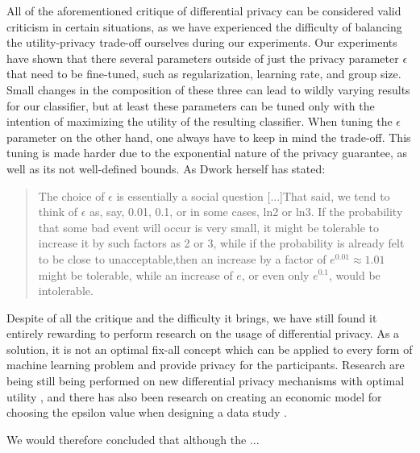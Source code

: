 All of the aforementioned critique of differential privacy can be considered valid criticism in certain situations, as we have experienced the difficulty of balancing the utility-privacy trade-off ourselves during our experiments. Our experiments have shown that there several parameters outside of just the privacy parameter $\epsilon$ that need to be fine-tuned, such as regularization, learning rate, and group size. Small changes in the composition of these three can lead to wildly varying results for our classifier, but at least these parameters can be tuned only with the intention of maximizing the utility of the resulting classifier. When tuning the $\epsilon$ parameter on the other hand, one always have to keep in mind the trade-off. This tuning is made harder due to the exponential nature of the privacy guarantee, as well as its not well-defined bounds. As Dwork herself has stated\citep{dwork2008differential}: 
\begin{quote}
	The choice of $\epsilon$ is essentially a social question [...]That said, we tend to think of $\epsilon$ as, say, 0.01, 0.1, or in some cases, ln2 or ln3. If the probability that some bad event will occur is very small, it 	might be tolerable to increase it by such factors as 2 or 3, while if the probability is already felt to be close to unacceptable,then an increase by a factor of $e^{0.01} ≈ 1.01$ might be tolerable, 	while an increase of $e$, or even only $e^{0.1}$, would be intolerable.
\end{quote}

Despite of all the critique and the difficulty it brings, we have still found it entirely rewarding to perform research on the usage of differential privacy. As a solution, it is not an optimal fix-all concept which can be applied to every form of machine learning problem and provide privacy for the participants. Research are being still being performed on new differential privacy mechanisms with optimal utility \citep{eigner2014privada}, and there has also been research on creating an economic model for choosing the epsilon value when designing a data study \citep{hsu2014economicEpsilon}.

 We would therefore concluded that although the ... 

 

